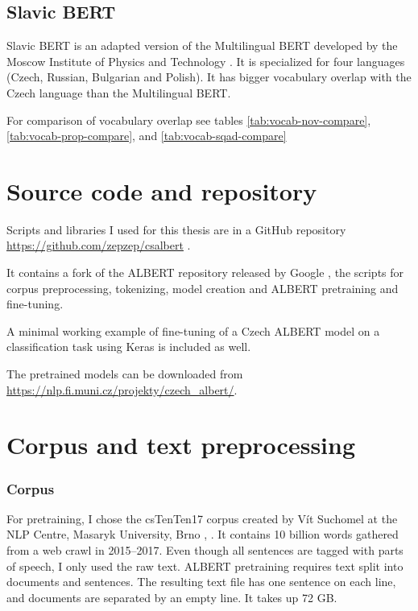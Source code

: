 \documentclass[
  printed, %
  color,   %
  table,   %
  oneside, %
  lof,     %
  lot,     %
]{fithesis3}
\begin{document}
\subsection{Slavic BERT}
Slavic BERT is an adapted version of the Multilingual BERT developed by the Moscow Institute of Physics and Technology \parencite{slavicbert}. It is specialized for four languages (Czech, Russian, Bulgarian and Polish). It has bigger vocabulary overlap with the Czech language than the Multilingual BERT.

\vspace{1em}

{\parindent=0cm
For comparison of vocabulary overlap see tables \ref{tab:vocab-nov-compare}, \ref{tab:vocab-prop-compare}, and \ref{tab:vocab-sqad-compare}
}


\section{Source code and repository}
Scripts and libraries I used for this thesis are in a GitHub repository \url{https://github.com/zepzep/csalbert} \parencite{thesis_repo}.

It contains a fork of the ALBERT repository released by Google \parencite{albert_repo}, the scripts for corpus preprocessing, tokenizing, model creation and ALBERT pretraining and fine-tuning.

A minimal working example of fine-tuning of a Czech ALBERT model on a classification task using Keras is included as well.

The pretrained models can be downloaded from \url{https://nlp.fi.muni.cz/projekty/czech_albert/}.


\section{Corpus and text preprocessing}
\subsubsection{Corpus}
For pretraining, I chose the csTenTen17 corpus created by Vít Suchomel at the NLP Centre, Masaryk University, Brno \parencite{tenten1}, \parencite{tenten2}. It contains 10 billion words gathered from a web crawl in 2015--2017.  Even though all sentences are tagged with parts of speech, I only used the raw text. ALBERT pretraining requires text split into documents and sentences. The resulting text file has one sentence on each line, and documents are separated by an empty line. It takes up 72 GB. 
\end{document}
